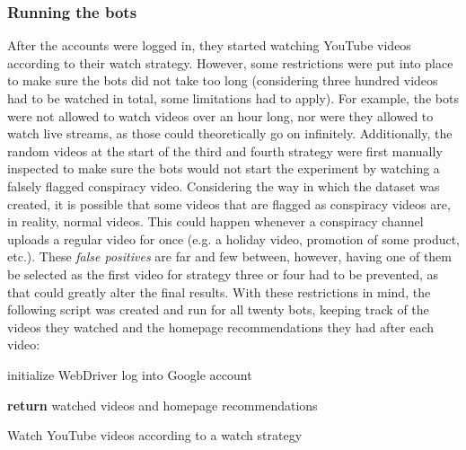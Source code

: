 \documentclass[../main.tex]{subfiles}
\begin{document}
\subsubsection{Running the bots}
After the accounts were logged in, they started watching YouTube videos according to their watch
strategy. However, some restrictions were put into place to make sure the bots did not take too long
(considering three hundred videos had to be watched in total, some limitations had to apply). For
example, the bots were not allowed to watch videos over an hour long, nor were they allowed to watch live
streams, as those could theoretically go on infinitely. Additionally, the random videos at the start of
the third and fourth strategy were first manually inspected to make sure the bots would not start the
experiment by watching a falsely flagged conspiracy video. Considering the way in which the dataset was
created, it is possible that some videos that are flagged as conspiracy videos are, in reality, normal 
videos. This could happen whenever a conspiracy channel uploads a regular video for once (e.g. a holiday 
video, promotion of some product, etc.). These \textit{false positives} are far and few between, however,
having one of them be selected as the first video for strategy three or four had to be prevented, as that
could greatly alter the final results. With these restrictions in mind, the following script was created
and run for all twenty bots, keeping track of the videos they watched and the homepage recommendations they
had after each video:

\vspace{0.25in}

\nolinenumbers

\begin{algorithm}[H]
 
 \vspace{0.075in}
 initialize WebDriver\;
 log into Google account\;

 \vspace{0.05in}
 \textbf{return} watched videos and homepage recommendations\;
 \caption{Watch YouTube videos according to a watch strategy}
\end{algorithm}
\end{document}
